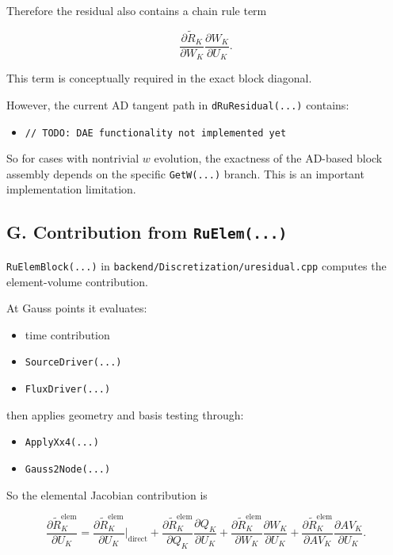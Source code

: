 \documentclass[11pt]{article}
\begin{document}
Therefore the residual also contains a chain rule term

\[
\frac{\partial \widetilde R_K}{\partial W_K}\frac{\partial W_K}{\partial U_K}.
\]

This term is conceptually required in the exact block diagonal.

However, the current AD tangent path in \texttt{dRuResidual(...)} contains:

\begin{itemize}[leftmargin=*]
\item \texttt{// TODO: DAE functionality not implemented yet}
\end{itemize}

So for cases with nontrivial $w$ evolution, the exactness of the AD-based
block assembly depends on the specific \texttt{GetW(...)} branch. This is an
important implementation limitation.

\subsection*{G. Contribution from \texttt{RuElem(...)}}

\texttt{RuElemBlock(...)} in \texttt{backend/Discretization/uresidual.cpp}
computes the element-volume contribution.

At Gauss points it evaluates:

\begin{itemize}[leftmargin=*]
\item time contribution
\item \texttt{SourceDriver(...)}
\item \texttt{FluxDriver(...)}
\end{itemize}

then applies geometry and basis testing through:

\begin{itemize}[leftmargin=*]
\item \texttt{ApplyXx4(...)}
\item \texttt{Gauss2Node(...)}
\end{itemize}

So the elemental Jacobian contribution is

\[
\frac{\partial \widetilde R_K^{\mathrm{elem}}}{\partial U_K}
=
\frac{\partial \widetilde R_K^{\mathrm{elem}}}{\partial U_K}\Big|_{\text{direct}}
+
\frac{\partial \widetilde R_K^{\mathrm{elem}}}{\partial Q_K}\frac{\partial Q_K}{\partial U_K}
+
\frac{\partial \widetilde R_K^{\mathrm{elem}}}{\partial W_K}\frac{\partial W_K}{\partial U_K}
+
\frac{\partial \widetilde R_K^{\mathrm{elem}}}{\partial AV_K}\frac{\partial AV_K}{\partial U_K}.
\]
\end{document}
